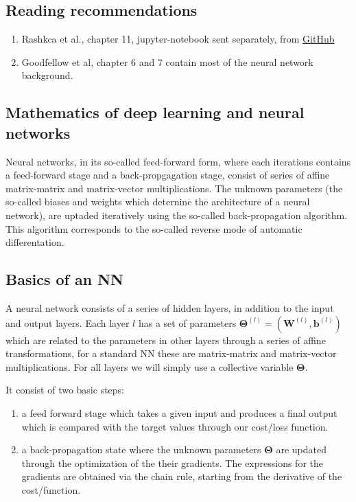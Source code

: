 \documentclass[%
oneside,                 %
final,                   %
10pt]{article}
\begin{document}
\subsection{Reading recommendations}

\begin{enumerate}
\item Rashkca et al., chapter 11, jupyter-notebook sent separately, from \href{{https://github.com/rasbt/machine-learning-book}}{GitHub}

\item Goodfellow et al, chapter 6 and 7 contain most of the neural network background.
\end{enumerate}

\noindent
\subsection{Mathematics of deep learning and neural networks}

Neural networks, in its so-called feed-forward form, where each
iterations contains a feed-forward stage and a back-propgagation
stage, consist of series of affine matrix-matrix and matrix-vector
multiplications. The unknown parameters (the so-called biases and
weights which deternine the architecture of a neural network), are
uptaded iteratively using the so-called back-propagation algorithm.
This algorithm corresponds to the so-called reverse mode of 
automatic differentation. 

\subsection{Basics of an NN}

A neural network consists of a series of hidden layers, in addition to
the input and output layers.  Each layer $l$ has a set of parameters
$\bm{\Theta}^{(l)}=(\bm{W}^{(l)},\bm{b}^{(l)})$ which are related to the
parameters in other layers through a series of affine transformations,
for a standard NN these are matrix-matrix and matrix-vector
multiplications.  For all layers we will simply use a collective variable $\bm{\Theta}$.

It consist of two basic steps:
\begin{enumerate}
\item a feed forward stage which takes a given input and produces a final output which is compared with the target values through our cost/loss function.

\item a back-propagation state where the unknown parameters $\bm{\Theta}$ are updated through the optimization of the their gradients. The expressions for the gradients are obtained via the chain rule, starting from the derivative of the cost/function.
\end{enumerate}
\end{document}
